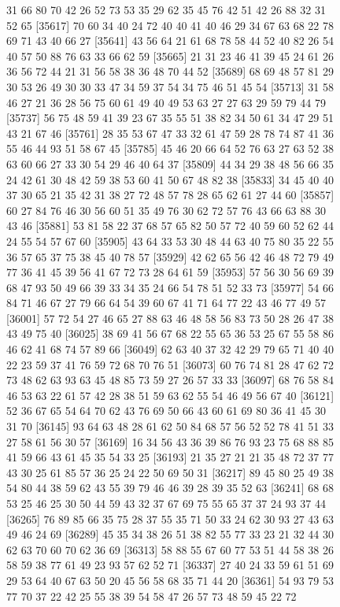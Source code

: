\documentclass{article}
\begin{document}
\begin{figure}[H]
\begin{Schunk}
\begin{Soutput}
[35593] 31 66 80 70 42 26 52 73 53 35 29 62 35 45 76 42 51 42 26 88 32 31 52 65
[35617] 70 60 34 40 24 72 40 40 41 40 46 29 34 67 63 68 22 78 69 71 43 40 66 27
[35641] 43 56 64 21 61 68 78 58 44 52 40 82 26 54 40 57 50 88 76 63 33 66 62 59
[35665] 21 31 23 46 41 39 45 24 61 26 36 56 72 44 21 31 56 58 38 36 48 70 44 52
[35689] 68 69 48 57 81 29 30 53 26 49 30 30 33 47 34 59 37 54 34 75 46 51 45 54
[35713] 31 58 46 27 21 36 28 56 75 60 61 49 40 49 53 63 27 27 63 29 59 79 44 79
[35737] 56 75 48 59 41 39 23 67 35 55 51 38 82 34 50 61 34 47 29 51 43 21 67 46
[35761] 28 35 53 67 47 33 32 61 47 59 28 78 74 87 41 36 55 46 44 93 51 58 67 45
[35785] 45 46 20 66 64 52 76 63 27 63 52 38 63 60 66 27 33 30 54 29 46 40 64 37
[35809] 44 34 29 38 48 56 66 35 24 42 61 30 48 42 59 38 53 60 41 50 67 48 82 38
[35833] 34 45 40 40 37 30 65 21 35 42 31 38 27 72 48 57 78 28 65 62 61 27 44 60
[35857] 60 27 84 76 46 30 56 60 51 35 49 76 30 62 72 57 76 43 66 63 88 30 43 46
[35881] 53 81 58 22 37 68 57 65 82 50 57 72 40 59 60 52 62 44 24 55 54 57 67 60
[35905] 43 64 33 53 30 48 44 63 40 75 80 35 22 55 36 57 65 37 75 38 45 40 78 57
[35929] 42 62 65 56 42 46 48 72 79 49 77 36 41 45 39 56 41 67 72 73 28 64 61 59
[35953] 57 56 30 56 69 39 68 47 93 50 49 66 39 33 34 35 24 66 54 78 51 52 33 73
[35977] 54 66 84 71 46 67 27 79 66 64 54 39 60 67 41 71 64 77 22 43 46 77 49 57
[36001] 57 72 54 27 46 65 27 88 63 46 48 58 56 83 73 50 28 26 47 38 43 49 75 40
[36025] 38 69 41 56 67 68 22 55 65 36 53 25 67 55 58 86 46 62 41 68 74 57 89 66
[36049] 62 63 40 37 32 42 29 79 65 71 40 40 22 23 59 37 41 76 59 72 68 70 76 51
[36073] 60 76 74 81 28 47 62 72 73 48 62 63 93 63 45 48 85 73 59 27 26 57 33 33
[36097] 68 76 58 84 46 53 63 22 61 57 42 28 38 51 59 63 62 55 54 46 49 56 67 40
[36121] 52 36 67 65 54 64 70 62 43 76 69 50 66 43 60 61 69 80 36 41 45 30 31 70
[36145] 93 64 63 48 28 61 62 50 84 68 57 56 52 52 78 41 51 33 27 58 61 56 30 57
[36169] 16 34 56 43 36 39 86 76 93 23 75 68 88 85 41 59 66 43 61 45 35 54 33 25
[36193] 21 35 27 21 21 35 48 72 37 77 43 30 25 61 85 57 36 25 24 22 50 69 50 31
[36217] 89 45 80 25 49 38 54 80 44 38 59 62 43 55 39 79 46 46 39 28 39 35 52 63
[36241] 68 68 53 25 46 25 30 50 44 59 43 32 37 67 69 75 55 65 37 37 24 93 37 44
[36265] 76 89 85 66 35 75 28 37 55 35 71 50 33 24 62 30 93 27 43 63 49 46 24 69
[36289] 45 35 34 38 26 51 38 82 55 77 33 23 21 32 44 30 62 63 70 60 70 62 36 69
[36313] 58 88 55 67 60 77 53 51 44 58 38 26 58 59 38 77 61 49 23 93 57 62 52 71
[36337] 27 40 24 33 59 61 51 69 29 53 64 40 67 63 50 20 45 56 58 68 35 71 44 20
[36361] 54 93 79 53 77 70 37 22 42 25 55 38 39 54 58 47 26 57 73 48 59 45 22 72

\end{Soutput}
\end{Schunk}
\end{figure}
\end{document}
